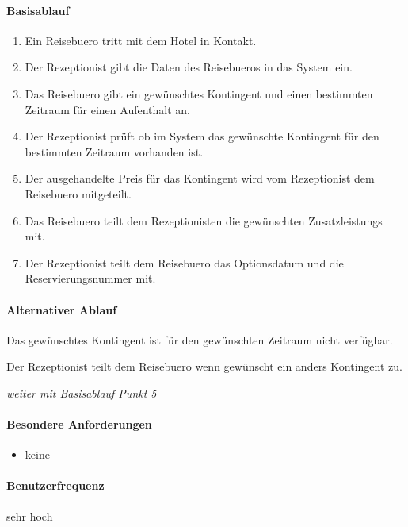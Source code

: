 \paragraph{Basisablauf}
\begin{enumerate}
	\item Ein \Gls{Reisebuero} tritt mit dem Hotel in Kontakt.
	\item Der \Gls{Rezeptionist} gibt die Daten des \Gls{Reisebuero}s in das System ein.
	\item Das \Gls{Reisebuero} gibt ein gewünschtes \Gls{Kontingent} und einen bestimmten Zeitraum für einen Aufenthalt an. 
    \item Der \Gls{Rezeptionist} prüft ob im System das gewünschte \Gls{Kontingent} für den bestimmten Zeitraum vorhanden ist. 
	\item Der ausgehandelte Preis für das \Gls{Kontingent} wird vom \Gls{Rezeptionist} dem \Gls{Reisebuero} mitgeteilt.
	\item Das \Gls{Reisebuero} teilt dem \Gls{Rezeptionist}en die gewünschten \Glspl{Zusatzleistung} mit.
	\item Der \Gls{Rezeptionist} teilt dem \Gls{Reisebuero} das \Gls{Optionsdatum} und die \Gls{Reservierungsnummer} mit.
\end{enumerate}

\paragraph{Alternativer Ablauf}
\begin{longenum}
	\item
	\item
	\item
	\item
	\begin{longenum}
		\item Das gewünschtes \Gls{Kontingent} ist für den gewünschten Zeitraum nicht verfügbar.
		\begin{longenum}
			\item Der \Gls{Rezeptionist} teilt dem \Gls{Reisebuero} wenn gewünscht ein anders \Gls{Kontingent} zu.
			\item \emph{weiter mit Basisablauf Punkt 5}
		\end{longenum}
	\end{longenum}
	\item
	\item
	\item
\end{longenum}

\paragraph{Besondere Anforderungen}
\begin{itemize}
	\item keine
\end{itemize}

\paragraph{Benutzerfrequenz}
sehr hoch

\newpage

